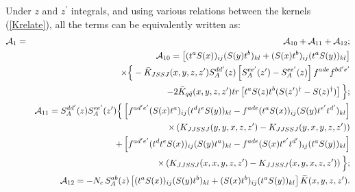 \documentclass[11pt,a4paper]{article}
\begin{document}
Under  $z$ and $z^\prime$ integrals, and using various relations between the kernels (\ref{Krelate}), all the terms  can be equivalently written as:
\begin{eqnarray}
{\cal A}_1&=& {\cal A}_{10}+{\cal A}_{11}+{\cal A}_{12};\nonumber \\ 
&&{\cal A}_{10}=\left[(t^{a}S(x))_{ij}(S(y)t^{b})_{kl}+(S(x)t^{b})_{ij}(t^{a}S(y))_{kl}\right] 
\nonumber \\
&&\times\Big\{ - \bar K_{JSSJ}(x,y,z,z^{\prime}) S_{A}^{dd^{\prime}}(z)\left[S_{A}^{ee^{\prime}}(z^{\prime})-S_{A}^{ee^{\prime}}(z)\right] f^{ade}f^{bd^{\prime}e^{\prime}}\nonumber \\
&&-2\bar K_{q\bar{q}}(x,y,z,z^{\prime}) tr\left[t^{a}S(z)t^{b}(S(z^{\prime})^{\dagger}-S(z)^{\dagger})\right]\Big\};\nonumber \\
&&{\cal A}_{11}=S_{A}^{dd^{\prime}}(z)S_{A}^{ee^{\prime}}(z^{\prime})
 \Big\{ \left[f^{ad^{\prime}e^{\prime}}(S(x)t^{a})_{ij}(t^{d}t^{e}S(y))_{kl}-f^{ade}(t^{a}S(x))_{ij}(S(y)t^{e^{\prime}}t^{d^{\prime}})_{kl}\right] \nonumber \\
&&\times \left( K_{JJSSJ}(y,y,x,z,z^{\prime})-K_{JJSSJ}(y,x,y,z,z^{\prime})\right)\nonumber \\
&&+ \left[f^{ad^{\prime}e^{\prime}}(t^{d}t^{e}S(x))_{ij}(S(y)t^{a})_{kl}-f^{ade}(S(x)t^{e^{\prime}}t^{d^{\prime}})_{ij}(t^{a}S(y))_{kl}\right]\nonumber \\
&&\times \left( K_{JJSSJ}(x,x,y,z,z^{\prime})-K_{JJSSJ}(x,y,x,z,z^{\prime})\right)\Big\};\nonumber \\
&&{\cal A}_{12}=- N_c\,S_A^{ab}(z) \left[(t^{a}S(x))_{ij}(S(y)t^{b})_{kl}+(S(x)t^{b})_{ij}(t^{a}S(y))_{kl}\right]  \widetilde{K}(x,y,z,z^{\prime}).
\end{eqnarray}
\end{document}
